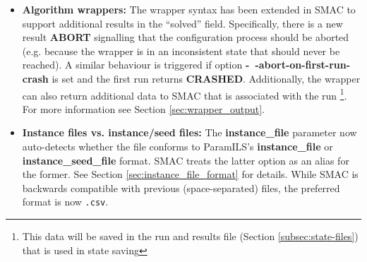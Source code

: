\begin{itemize}
\item \textbf{Algorithm wrappers:} 
The wrapper syntax has been extended in SMAC to support additional results in the ``solved'' field. Specifically, there is a new result \textbf{ABORT} signalling that the configuration process should be aborted (e.g. because the wrapper is in an inconsistent state that should never be reached). A similar behaviour is triggered if option \textbf{-~$\!$-abort-on-first-run-crash} is set and the first run returns \textbf{CRASHED}. Additionally, the wrapper can also return additional data to SMAC that is associated with the run \footnote{This data will be saved in the run and results file (Section \ref{subsec:state-files}) that is used in state saving}. For more information see Section \ref{sec:wrapper_output}.

\item \textbf{Instance files vs. instance/seed files:} 
The \textbf{instance\_file} parameter now auto-detects whether the file conforms to ParamILS's \textbf{instance\_file} or \textbf{instance\_seed\_file} format. SMAC treats the latter option as an alias for the former. See Section \ref{sec:instance_file_format} for details.
While SMAC is backwards compatible with previous (space-separated) files, the preferred format is now \texttt{.csv}.
\end{itemize}
